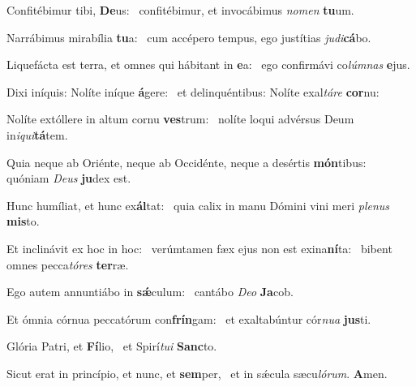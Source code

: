 \item Confitébimur tibi, \textbf{De}us:~\psstar{} confitébimur, et invocábimus \textit{nomen} \textbf{tu}um.

\item Narrábimus mirabília \textbf{tu}a:~\psstar{} cum accépero tempus, ego justítias \textit{judi}\textbf{cá}bo.

\item Liquefácta est terra, et omnes qui hábitant in \textbf{e}a:~\psstar{} ego confirmávi co\textit{lúmnas} \textbf{e}jus.

\item Dixi iníquis: Nolíte iníque \textbf{á}gere:~\psstar{} et delinquéntibus: Nolíte exal\textit{táre} \textbf{cor}nu:

\item Nolíte extóllere in altum cornu \textbf{ves}trum:~\psstar{} nolíte loqui advérsus Deum in\textit{iqui}\textbf{tá}tem.

\item Quia neque ab Oriénte, neque ab Occidénte, neque a desértis \textbf{món}tibus:~\psstar{} quóniam \textit{Deus} \textbf{ju}dex est.

\item Hunc humíliat, et hunc ex\textbf{ál}tat:~\psstar{} quia calix in manu Dómini vini meri \textit{plenus} \textbf{mis}to.

\item Et inclinávit ex hoc in hoc:~\pscross{} verúmtamen fæx ejus non est exina\textbf{ní}ta:~\psstar{} bibent omnes pecca\textit{tóres} \textbf{ter}ræ.

\item Ego autem annuntiábo in \textbf{sǽ}culum:~\psstar{} cantábo \textit{Deo} \textbf{Ja}cob.

\item Et ómnia córnua peccatórum con\textbf{frín}gam:~\psstar{} et exaltabúntur cór\textit{nua} \textbf{jus}ti.

\item Glória Patri, et \textbf{Fí}lio,~\psstar{} et Spirí\textit{tui} \textbf{Sanc}to.

\item Sicut erat in princípio, et nunc, et \textbf{sem}per,~\psstar{} et in sǽcula sæcu\textit{lórum}. \textbf{A}men.
